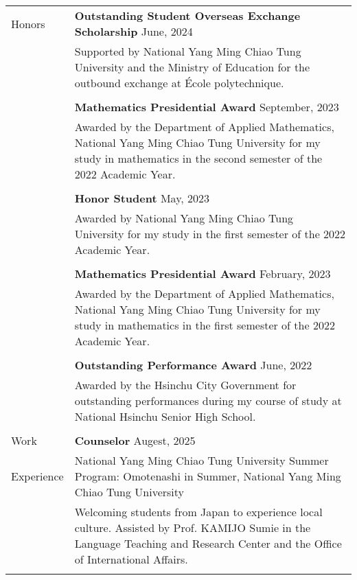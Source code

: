 \documentclass[letterpaper, 11pt]{article}
\begin{document}
\begin{center}
\begin{longtable}{p{0.76in}p{5.93in}}
        {\textcolor{OliveGreen}{Honors}} & \textbf{Outstanding Student Overseas Exchange Scholarship} \hfill June, 2024\\
        & Supported by National Yang Ming Chiao Tung University and the Ministry of Education for the outbound exchange at \'Ecole polytechnique. \\
        & \\
        & \textbf{Mathematics Presidential Award} \hfill September, 2023\\
        & Awarded by the Department of Applied Mathematics, National Yang Ming Chiao Tung University for my study in mathematics in the second semester of the 2022 Academic Year.\\
        & \\
        & \textbf{Honor Student} \hfill May, 2023\\
        & Awarded by National Yang Ming Chiao Tung University for my study in the first semester of the 2022 Academic Year. \\
        & \\
        & \textbf{Mathematics Presidential Award} \hfill February, 2023\\
        & Awarded by the Department of Applied Mathematics, National Yang Ming Chiao Tung University for my study in mathematics in the first semester of the 2022 Academic Year.\\
        & \\
        & \textbf{Outstanding Performance Award} \hfill June, 2022\\
        & Awarded by the Hsinchu City Government for outstanding performances during my course of study at National Hsinchu Senior High School.\\
        & \\
        
        
        {\textcolor{OliveGreen}{Work}} & \textbf{Counselor} \hfill Augest, 2025 \\
        {\textcolor{OliveGreen}{Experience}} & National Yang Ming Chiao Tung University Summer Program: Omotenashi in Summer, National Yang Ming Chiao Tung University \\
        & Welcoming students from Japan to experience local culture. Assisted by Prof. KAMIJO Sumie in the Language Teaching and Research Center and the Office of International Affairs.\\
        & \\
        

\end{longtable}
\end{center}
\end{document}
